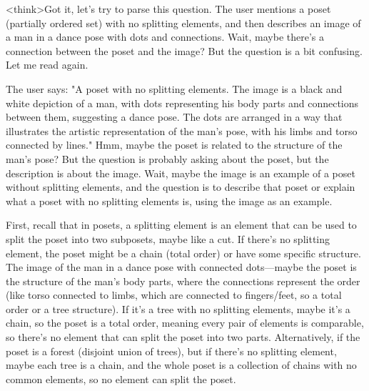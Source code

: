 <think>Got it, let's try to parse this question. The user mentions a poset (partially ordered set) with no splitting elements, and then describes an image of a man in a dance pose with dots and connections. Wait, maybe there's a connection between the poset and the image? But the question is a bit confusing. Let me read again.

The user says: "A poset with no splitting elements. The image is a black and white depiction of a man, with dots representing his body parts and connections between them, suggesting a dance pose. The dots are arranged in a way that illustrates the artistic representation of the man's pose, with his limbs and torso connected by lines." Hmm, maybe the poset is related to the structure of the man's pose? But the question is probably asking about the poset, but the description is about the image. Wait, maybe the image is an example of a poset without splitting elements, and the question is to describe that poset or explain what a poset with no splitting elements is, using the image as an example.

First, recall that in posets, a splitting element is an element that can be used to split the poset into two subposets, maybe like a cut. If there's no splitting element, the poset might be a chain (total order) or have some specific structure. The image of the man in a dance pose with connected dots—maybe the poset is the structure of the man's body parts, where the connections represent the order (like torso connected to limbs, which are connected to fingers/feet, so a total order or a tree structure). If it's a tree with no splitting elements, maybe it's a chain, so the poset is a total order, meaning every pair of elements is comparable, so there's no element that can split the poset into two parts. Alternatively, if the poset is a forest (disjoint union of trees), but if there's no splitting element, maybe each tree is a chain, and the whole poset is a collection of chains with no common elements, so no element can split the poset.

